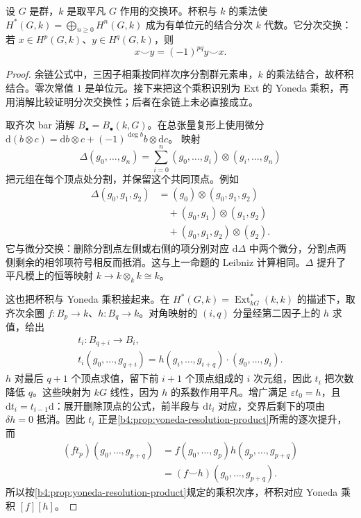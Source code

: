 \begin{theorem}[群上同调环]\label{b4:thm:group-cohomology-ring}
	设 \(G\) 是群，\(k\) 是取平凡 \(G\) 作用的交换环。杯积与 \(k\) 的乘法使 \(H^*(G,k)=\bigoplus_{n\ge0}H^n(G,k)\) 成为有单位元的结合分次 \(k\) 代数。它分次交换：若 \(x\in H^p(G,k)\)、\(y\in H^q(G,k)\)，则
	\[
		x\smile y=(-1)^{pq}y\smile x.
	\]
\end{theorem}
\begin{proof}
	余链公式中，三因子相乘按同样次序分割群元素串，\(k\) 的乘法结合，故杯积结合。零次常值 \(1\) 是单位元。接下来把这个乘积识别为 Ext 的 Yoneda 乘积，再用消解比较证明分次交换性；后者在余链上未必直接成立。

	取齐次 bar 消解 \(B_\bullet=B_\bullet(k,G)\)。在总张量复形上使用微分 \(\mathrm{d}(b\otimes c)=\mathrm{d}b\otimes c+(-1)^{\deg b}b\otimes \mathrm{d}c\)。 映射
	\[
		\Delta(g_0,\ldots,g_n) =\sum_{i=0}^n(g_0,\ldots,g_i)\otimes(g_i,\ldots,g_n)
	\]
	把元组在每个顶点处分割，并保留这个共同顶点。例如
	\[
		\begin{aligned}
			\Delta(g_0,g_1,g_2) &=(g_0)\otimes(g_0,g_1,g_2)\\
			&\quad+(g_0,g_1)\otimes(g_1,g_2)\\
			&\quad+(g_0,g_1,g_2)\otimes(g_2).
		\end{aligned}
	\]
	它与微分交换：删除分割点左侧或右侧的项分别对应 \(\mathrm{d}\Delta\) 中两个微分，分割点两侧剩余的相邻项符号相反而抵消。这与上一命题的 Leibniz 计算相同。\(\Delta\) 提升了平凡模上的恒等映射 \(k\to k\otimes_k k\cong k\)。

	这也把杯积与 Yoneda 乘积接起来。在 \(H^*(G,k)=\operatorname{Ext}_{kG}^*(k,k)\) 的描述下，取齐次余圈 \(f:B_p\to k\)、\(h:B_q\to k\)。对角映射的 \((i,q)\) 分量经第二因子上的 \(h\) 求值，给出
	\[
		\begin{gathered}
			t_i:B_{q+i}\longrightarrow B_i,\\
			t_i(g_0,\ldots,g_{q+i}) =h(g_i,\ldots,g_{i+q})\cdot(g_0,\ldots,g_i).
		\end{gathered}
	\]
	\(h\) 对最后 \(q+1\) 个顶点求值，留下前 \(i+1\) 个顶点组成的 \(i\) 次元组，因此 \(t_i\) 把次数降低 \(q\)。这些映射为 \(kG\) 线性，因为 \(h\) 的系数作用平凡。增广满足 \(\varepsilon t_0=h\)，且 \(\mathrm{d}t_i=t_{i-1}\mathrm{d}\)：展开删除顶点的公式，前半段与 \(\mathrm{d}t_i\) 对应，交界后剩下的项由 \(\delta h=0\) 抵消。因此 \(t_i\) 正是\cref{b4:prop:yoneda-resolution-product}所需的逐次提升，而
	\[
		\begin{aligned}
			(ft_p)(g_0,\ldots,g_{p+q}) &=f(g_0,\ldots,g_p)h(g_p,\ldots,g_{p+q})\\
			&=(f\smile h)(g_0,\ldots,g_{p+q}).
		\end{aligned}
	\]
	所以按\cref{b4:prop:yoneda-resolution-product}规定的乘积次序，杯积对应 Yoneda 乘积 \([f][h]\)。


\end{proof}
